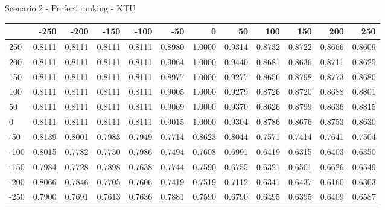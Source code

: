 Scenario 2 - Perfect ranking - KTU
\begin{tabular}{lrrrrrrrrrrr}
\toprule
{} &   -250 &   -200 &   -150 &   -100 &   -50  &    0   &    50  &    100 &    150 &    200 &    250 \\
\midrule
 250 & 0.8111 & 0.8111 & 0.8111 & 0.8111 & 0.8980 & 1.0000 & 0.9314 & 0.8732 & 0.8722 & 0.8666 & 0.8609 \\
 200 & 0.8111 & 0.8111 & 0.8111 & 0.8111 & 0.9064 & 1.0000 & 0.9440 & 0.8681 & 0.8636 & 0.8711 & 0.8625 \\
 150 & 0.8111 & 0.8111 & 0.8111 & 0.8111 & 0.8977 & 1.0000 & 0.9277 & 0.8656 & 0.8798 & 0.8773 & 0.8680 \\
 100 & 0.8111 & 0.8111 & 0.8111 & 0.8111 & 0.9005 & 1.0000 & 0.9279 & 0.8726 & 0.8720 & 0.8688 & 0.8801 \\
 50  & 0.8111 & 0.8111 & 0.8111 & 0.8111 & 0.9069 & 1.0000 & 0.9370 & 0.8626 & 0.8799 & 0.8636 & 0.8815 \\
 0   & 0.8111 & 0.8111 & 0.8111 & 0.8111 & 0.9015 & 1.0000 & 0.9304 & 0.8786 & 0.8676 & 0.8753 & 0.8630 \\
-50  & 0.8139 & 0.8001 & 0.7983 & 0.7949 & 0.7714 & 0.8623 & 0.8044 & 0.7571 & 0.7414 & 0.7641 & 0.7504 \\
-100 & 0.8015 & 0.7782 & 0.7750 & 0.7986 & 0.7494 & 0.7608 & 0.6991 & 0.6419 & 0.6315 & 0.6403 & 0.6350 \\
-150 & 0.7984 & 0.7728 & 0.7898 & 0.7638 & 0.7744 & 0.7590 & 0.6755 & 0.6321 & 0.6501 & 0.6626 & 0.6549 \\
-200 & 0.8066 & 0.7846 & 0.7705 & 0.7606 & 0.7419 & 0.7519 & 0.7112 & 0.6341 & 0.6437 & 0.6160 & 0.6303 \\
-250 & 0.7900 & 0.7691 & 0.7613 & 0.7636 & 0.7881 & 0.7590 & 0.6790 & 0.6495 & 0.6395 & 0.6409 & 0.6587 \\
\bottomrule
\end{tabular}

